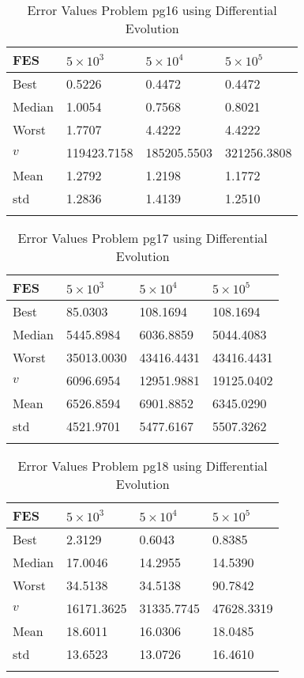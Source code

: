 \documentclass[10pt, a4paper]{book}
\begin{document}
\begin{center}
\begin{longtable}{l l l l}
FES & $5 \times 10^{3}$ & $5 \times 10^{4}$ & $5 \times 10^{5}$ \\
\hline
Best & 0.5226 & 0.4472 & 0.4472 \\
Median & 1.0054 & 0.7568 & 0.8021 \\
Worst & 1.7707 & 4.4222 & 4.4222 \\
$v$ & 119423.7158 & 185205.5503 & 321256.3808 \\
Mean & 1.2792 & 1.2198 & 1.1772 \\
std & 1.2836 & 1.4139 & 1.2510 \\
\caption{ Error Values Problem pg16 using Differential Evolution }
\end{longtable}
\end{center}

\begin{center}
\begin{longtable}{l l l l}
FES & $5 \times 10^{3}$ & $5 \times 10^{4}$ & $5 \times 10^{5}$ \\
\hline
Best & 85.0303 & 108.1694 & 108.1694 \\
Median & 5445.8984 & 6036.8859 & 5044.4083 \\
Worst & 35013.0030 & 43416.4431 & 43416.4431 \\
$v$ & 6096.6954 & 12951.9881 & 19125.0402 \\
Mean & 6526.8594 & 6901.8852 & 6345.0290 \\
std & 4521.9701 & 5477.6167 & 5507.3262 \\
\caption{ Error Values Problem pg17 using Differential Evolution }
\end{longtable}
\end{center}

\begin{center}
\begin{longtable}{l l l l}
FES & $5 \times 10^{3}$ & $5 \times 10^{4}$ & $5 \times 10^{5}$ \\
\hline
Best & 2.3129 & 0.6043 & 0.8385 \\
Median & 17.0046 & 14.2955 & 14.5390 \\
Worst & 34.5138 & 34.5138 & 90.7842 \\
$v$ & 16171.3625 & 31335.7745 & 47628.3319 \\
Mean & 18.6011 & 16.0306 & 18.0485 \\
std & 13.6523 & 13.0726 & 16.4610 \\
\caption{ Error Values Problem pg18 using Differential Evolution }
\end{longtable}
\end{center}
\end{document}
